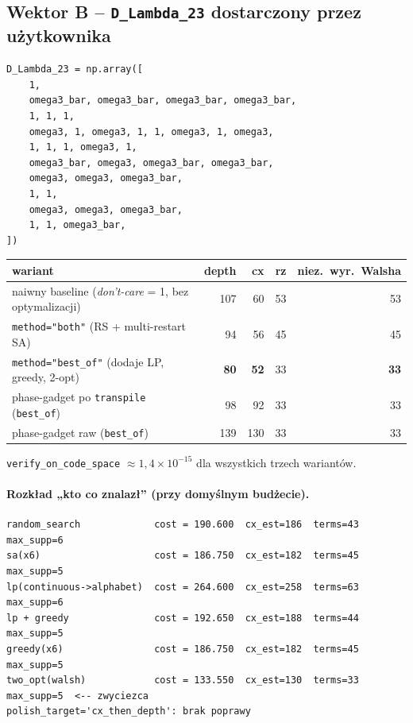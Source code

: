 \documentclass[11pt,a4paper]{article}
\newcommand{\1}{\mathbf{1}}
\newcommand{\code}[1]{\texttt{#1}}
\begin{document}
\subsection{Wektor B -- \texttt{D\_Lambda\_23} dostarczony przez
            użytkownika}
\label{sec:vec-B}

\begin{lstlisting}
D_Lambda_23 = np.array([
    1,
    omega3_bar, omega3_bar, omega3_bar, omega3_bar,
    1, 1, 1,
    omega3, 1, omega3, 1, 1, omega3, 1, omega3,
    1, 1, 1, omega3, 1,
    omega3_bar, omega3, omega3_bar, omega3_bar,
    omega3, omega3, omega3_bar,
    1, 1,
    omega3, omega3, omega3_bar,
    1, 1, omega3_bar,
])
\end{lstlisting}

\begin{center}
\begin{tabular}{l r r r r}
\toprule
\textbf{wariant} & \textbf{depth} & \textbf{cx} & \textbf{rz} &
\textbf{niez.\ wyr.\ Walsha}\\
\midrule
naiwny baseline (\emph{don't-care} = 1, bez optymalizacji) & 107 & 60 & 53 & 53\\
\code{method="both"} (RS + multi-restart SA)               &  94 & 56 & 45 & 45\\
\code{method="best\_of"} (dodaje LP, greedy, 2-opt)        & \textbf{80} & \textbf{52} & 33 & \textbf{33}\\
phase-gadget po \code{transpile} (\code{best\_of})         &  98 & 92 & 33 & 33\\
phase-gadget raw (\code{best\_of})                          & 139 &130 & 33 & 33\\
\bottomrule
\end{tabular}
\end{center}

\noindent
\code{verify\_on\_code\_space} $\approx 1{,}4\times 10^{-15}$ dla
wszystkich trzech wariantów.

\paragraph{Rozkład „kto co znalazł” (przy domyślnym budżecie).}
\begin{lstlisting}
random_search             cost = 190.600  cx_est=186  terms=43  max_supp=6
sa(x6)                    cost = 186.750  cx_est=182  terms=45  max_supp=5
lp(continuous->alphabet)  cost = 264.600  cx_est=258  terms=63  max_supp=6
lp + greedy               cost = 192.650  cx_est=188  terms=44  max_supp=5
greedy(x6)                cost = 186.750  cx_est=182  terms=45  max_supp=5
two_opt(walsh)            cost = 133.550  cx_est=130  terms=33  max_supp=5  <-- zwyciezca
polish_target='cx_then_depth': brak poprawy
\end{lstlisting}
\end{document}
